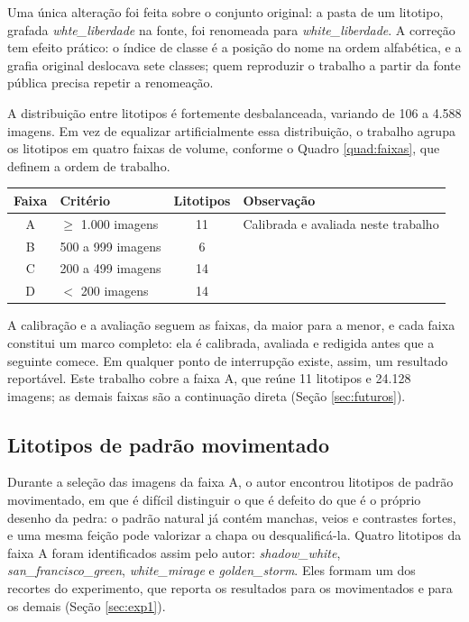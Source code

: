Uma única alteração foi feita sobre o conjunto original: a pasta de um litotipo, grafada \textit{whte\_liberdade} na fonte, foi renomeada para \textit{white\_liberdade}. A correção tem efeito prático: o índice de classe é a posição do nome na ordem alfabética, e a grafia original deslocava sete classes; quem reproduzir o trabalho a partir da fonte pública precisa repetir a renomeação.

A distribuição entre litotipos é fortemente desbalanceada, variando de 106 a 4.588 imagens. Em vez de equalizar artificialmente essa distribuição, o trabalho agrupa os litotipos em quatro faixas de volume, conforme o Quadro \ref{quad:faixas}, que definem a ordem de trabalho.

\begin{quadro}[ht]
  \caption{Faixas de volume de dados e respectivo número de litotipos.}
  \label{quad:faixas}
  \centering
  \begin{tabularx}{\textwidth}{clcX}
    \hline
    \bfseries Faixa & \bfseries Critério & \bfseries Litotipos & \bfseries Observação \\
    \hline
    A & $\geq$ 1.000 imagens & 11 & Calibrada e avaliada neste trabalho \\
    B & 500 a 999 imagens & 6 & \\
    C & 200 a 499 imagens & 14 & \\
    D & $<$ 200 imagens & 14 & \\
    \hline
  \end{tabularx}
\end{quadro}

A calibração e a avaliação seguem as faixas, da maior para a menor, e cada faixa constitui um marco completo: ela é calibrada, avaliada e redigida antes que a seguinte comece. Em qualquer ponto de interrupção existe, assim, um resultado reportável. Este trabalho cobre a faixa A, que reúne 11 litotipos e 24.128 imagens; as demais faixas são a continuação direta (Seção \ref{sec:futuros}).

\subsection{Litotipos de padrão movimentado}
\label{sec:movimentadas}

Durante a seleção das imagens da faixa A, o autor encontrou litotipos de padrão movimentado, em que é difícil distinguir o que é defeito do que é o próprio desenho da pedra: o padrão natural já contém manchas, veios e contrastes fortes, e uma mesma feição pode valorizar a chapa ou desqualificá-la. Quatro litotipos da faixa A foram identificados assim pelo autor: \textit{shadow\_white}, \textit{san\_francisco\_green}, \textit{white\_mirage} e \textit{golden\_storm}. Eles formam um dos recortes do experimento, que reporta os resultados para os movimentados e para os demais (Seção \ref{sec:exp1}).

